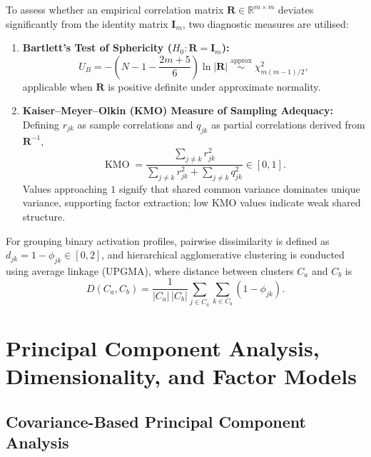 \documentclass[12pt, a4paper, oneside]{report}
\theoremstyle{definition}
\newcommand{\mat}[1]{\mathbf{#1}}
\newcommand{\R}{\mathbb{R}}
\begin{document}
To assess whether an empirical correlation matrix $\mat{R} \in \R^{m \times m}$ deviates significantly from the identity matrix $\mat{I}_m$, two diagnostic measures are utilised:
\begin{enumerate}
    \item \textbf{Bartlett's Test of Sphericity ($H_0: \mat{R} = \mat{I}_m$):}
    \begin{equation}
        U_B = -\left(N - 1 - \frac{2m + 5}{6}\right)\ln |\mat{R}| \;\stackrel{\text{approx}}{\sim}\; \chi^2_{m(m-1)/2},
        \label{eq:bartlett_sphericity}
    \end{equation}
    applicable when $\mat{R}$ is positive definite under approximate normality.
    \item \textbf{Kaiser--Meyer--Olkin (KMO) Measure of Sampling Adequacy:} Defining $r_{jk}$ as sample correlations and $q_{jk}$ as partial correlations derived from $\mat{R}^{-1}$,
    \begin{equation}
        \operatorname{KMO} = \frac{\sum_{j \neq k} r_{jk}^2}{\sum_{j \neq k} r_{jk}^2 + \sum_{j \neq k} q_{jk}^2} \in [0, 1].
        \label{eq:kmo_def}
    \end{equation}
    Values approaching $1$ signify that shared common variance dominates unique variance, supporting factor extraction; low KMO values indicate weak shared structure.
\end{enumerate}

For grouping binary activation profiles, pairwise dissimilarity is defined as $d_{jk} = 1 - \phi_{jk} \in [0, 2]$, and hierarchical agglomerative clustering is conducted using average linkage (UPGMA), where distance between clusters $C_a$ and $C_b$ is
\begin{equation}
    D(C_a, C_b) = \frac{1}{|C_a|\,|C_b|}\sum_{j \in C_a}\sum_{k \in C_b} (1 - \phi_{jk}).
    \label{eq:avg_linkage}
\end{equation}

\section{Principal Component Analysis, Dimensionality, and Factor Models}

\subsection{Covariance-Based Principal Component Analysis}
\end{document}
